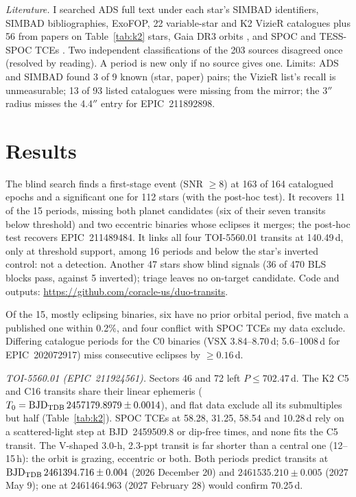 \documentclass{aastex701}
\begin{document}
\textit{Literature.} I searched ADS full text under each star's SIMBAD identifiers, SIMBAD
bibliographies, ExoFOP, 22 variable-star and K2 VizieR catalogues plus 56 from papers on
Table~\ref{tab:k2} stars, Gaia DR3 orbits \citep{Arenou2023}, and SPOC and TESS-SPOC TCEs
\citep{Jenkins2016,Twicken2018,Valizadegan2025}. Two independent classifications of the 203 sources
disagreed once (resolved by reading). A period is new only if no source gives one. Limits:
ADS and SIMBAD found 3 of 9 known (star, paper) pairs; the VizieR list's recall is unmeasurable; 13 of
93 listed catalogues were missing from the mirror; the 3$''$ radius misses the 4.4$''$
\citet{Libralato2016} entry for EPIC~211892898.

\section{Results}

The blind search finds a first-stage event (SNR $\geq8$) at 163 of 164 catalogued epochs and a
significant one for 112 stars (with the post-hoc test). It recovers 11 of the 15 periods, missing both
planet candidates (six of their seven transits below threshold) and two eccentric binaries whose
eclipses it merges; the post-hoc test recovers EPIC~211489484. It links all four TOI-5560.01 transits
at 140.49\,d, only at threshold support, among 16 periods and below the star's inverted control:
not a detection. Another 47 stars show blind signals (36 of 470 BLS blocks pass, against 5 inverted);
triage leaves no on-target candidate. Code and outputs:
\url{https://github.com/coracle-us/duo-transits}.

Of the 15, mostly eclipsing binaries, six have no prior orbital period, five match a
published one within 0.2\%, and four conflict with SPOC TCEs my data exclude. Differing catalogue
periods for the C0 binaries (VSX 3.84--8.70\,d; 5.6--1008\,d for EPIC~202072917) miss consecutive
eclipses by $\geq0.16$\,d.

\textit{TOI-5560.01 (EPIC~211924561).} Sectors 46 and 72 left $P\leq702.47$\,d. The K2 C5 and C16
transits share their linear ephemeris ($T_0={\rm BJD_{TDB}}\,2457179.8979\pm0.0014$), and flat data
exclude all its submultiples but half (Table~\ref{tab:k2}). SPOC TCEs at 58.28, 31.25, 58.54 and
10.28\,d rely on a scattered-light step at BJD~2459509.8 or dip-free times, and none fits the C5
transit. The V-shaped 3.0-h, 2.3-ppt transit is far shorter than a central one (12--15\,h): the orbit
is grazing, eccentric or both. Both periods predict transits at ${\rm BJD_{TDB}}\,2461394.716\pm0.004$
(2026 December 20) and $2461535.210\pm0.005$ (2027 May 9); one at 2461464.963 (2027 February 28) would
confirm 70.25\,d.
\end{document}
